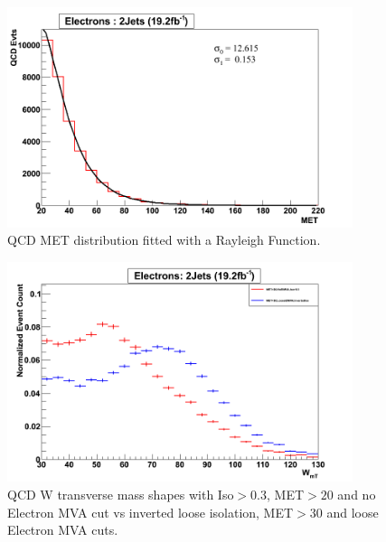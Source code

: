 \begin{figure}[h!] {\centering
{}\linewidth
\includegraphics[width=0.90\textwidth]{figs/qcd/RaileighFitQCD_19p2fb_el2j.png}
\caption{QCD MET distribution fitted with a Rayleigh Function.}
\label{fig:QCDMETRayleighFit}
}
\end{figure}
\begin{figure}[h!] {\centering
{}\linewidth
\includegraphics[width=0.90\textwidth]{figs/qcd/El2J_19p2fb_CutComparison_WmT.png}
\caption{ QCD W transverse mass shapes with Iso$>0.3$, MET$>20$ and no Electron MVA cut vs inverted loose isolation, MET$>30$ and loose Electron MVA cuts.}
\label{fig:QCDISOCutsWmTShape}
}
\end{figure}
